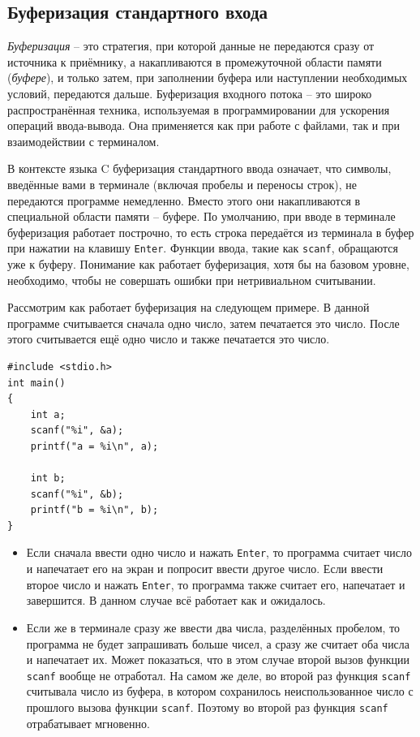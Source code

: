 \documentclass[10pt]{article}
\begin{document}
\subsection*{Буферизация стандартного входа}
\textit{Буферизация} -- это стратегия, при которой данные не передаются сразу от источника к приёмнику, а накапливаются в промежуточной области памяти (\textit{буфере}), и только затем, при заполнении буфера или наступлении необходимых условий, передаются дальше. Буферизация входного потока -- это широко распространённая техника, используемая в программировании для ускорения операций ввода-вывода. Она применяется как при работе с файлами, так и при взаимодействии с терминалом.

В контексте языка C буферизация стандартного ввода означает, что символы, введённые вами в терминале (включая пробелы и переносы строк), не передаются программе немедленно. Вместо этого они накапливаются в специальной области памяти -- буфере. По умолчанию, при вводе в терминале буферизация работает построчно, то есть строка передаётся из терминала в буфер при нажатии на клавишу \texttt{Enter}. Функции ввода, такие как \texttt{scanf}, обращаются уже к буферу.
Понимание как работает буферизация, хотя бы на базовом уровне, необходимо, чтобы не совершать ошибки при нетривиальном считывании.


Рассмотрим как работает буферизация на следующем примере. В данной программе считывается сначала одно число, затем печатается это число. После этого считывается ещё одно число и также печатается это число.
\begin{lstlisting}
#include <stdio.h>
int main()
{
	int a;
    scanf("%i", &a);
    printf("a = %i\n", a);

	int b;
    scanf("%i", &b);
    printf("b = %i\n", b);
}
\end{lstlisting}
\begin{itemize}
\item Если сначала ввести одно число и нажать \texttt{Enter}, то программа считает число и напечатает его на экран и попросит ввести другое число. Если ввести второе число и нажать \texttt{Enter}, то программа также считает его, напечатает и завершится. В данном случае всё работает как и ожидалось.
\item Если же в терминале сразу же ввести два числа, разделённых пробелом, то программа не будет запрашивать больше чисел, а сразу же считает оба числа и напечатает их. Может показаться, что в этом случае второй вызов функции \texttt{scanf} вообще не отработал. На самом же деле, во второй раз функция \texttt{scanf} считывала число из буфера, в котором сохранилось неиспользованное число с прошлого вызова функции \texttt{scanf}. Поэтому во второй раз функция \texttt{scanf} отрабатывает мгновенно.
\end{itemize}
\end{document}
